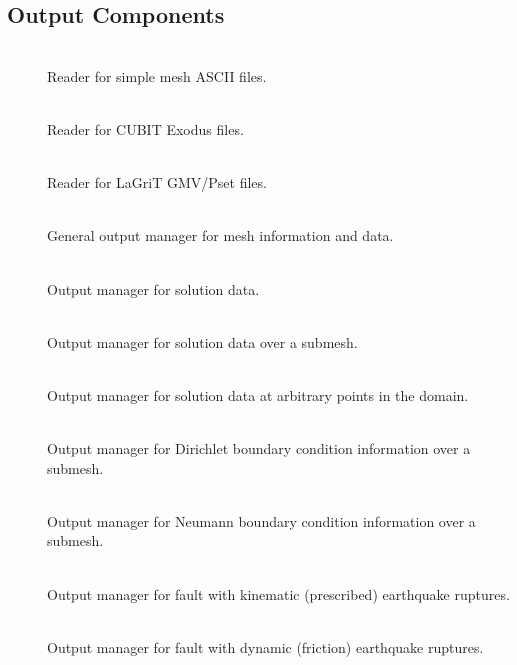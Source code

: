 \subsection{Output Components}
\begin{description}
\item [] \\
Reader for simple mesh ASCII files.
\item [] \\
Reader for CUBIT Exodus files.
\item [] \\
Reader for LaGriT GMV/Pset files.
\item [] \\
General output manager for mesh information and data.
\item [] \\
Output manager for solution data.
\item [] \\
Output manager for solution data over a submesh.
\item [] \\
Output manager for solution data at arbitrary points in the domain.
\item [] \\
Output manager for Dirichlet boundary condition information over a
submesh.
\item [] \\
Output manager for Neumann boundary condition information over a submesh.
\item [] \\
Output manager for fault with kinematic (prescribed) earthquake ruptures.
\item [] \\
Output manager for fault with dynamic (friction) earthquake ruptures.
\item [] \\

\end{description}
